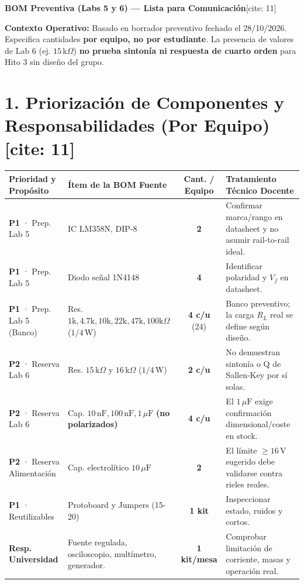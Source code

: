 \documentclass[10pt, a4paper]{article}
\begin{document}
\begin{center}
    {\Large\textbf{\textcolor{ucbblue}{BOM Preventiva (Labs 5 y 6) — Lista para Comunicación}}}[cite: 11]
\end{center}

\begin{tcolorbox}[colback=white, colframe=black, boxsep=1pt, top=2pt, bottom=2pt]
    \footnotesize\raggedright
    \textbf{Contexto Operativo:} Basado en borrador preventivo fechado el 28/10/2026. Especifica cantidades \textbf{por equipo, no por estudiante}. La presencia de valores de Lab 6 (ej. $15\,\text{k}\Omega$) \textbf{no prueba sintonía ni respuesta de cuarto orden} para Hito 3 sin diseño del grupo.
\end{tcolorbox}

\section*{1. Priorización de Componentes y Responsabilidades (Por Equipo)[cite: 11]}
\begin{table}[htbp]
    \centering
    \footnotesize
    \renewcommand{\arraystretch}{1.3}
    \begin{tabularx}{\textwidth}{|P{3.5cm}|P{3.8cm}|c|Y|}
    \hline
    \textbf{Prioridad y Propósito} & \textbf{Ítem de la BOM Fuente} & \textbf{Cant. / Equipo} & \textbf{Tratamiento Técnico Docente} \\ \hline
    \textbf{P1} · Prep. Lab 5 & IC LM358N, DIP-8 & \textbf{2} & Confirmar marca/rango en datasheet y no asumir rail-to-rail ideal.\\ \hline
    \textbf{P1} · Prep. Lab 5 & Diodo señal 1N4148 & \textbf{4} & Identificar polaridad y $V_f$ en datasheet. \\ \hline
    \textbf{P1} · Prep. Lab 5 (Banco) & Res. $1\text{k}, 4.7\text{k}, 10\text{k}, 22\text{k}, 47\text{k}, 100\text{k}\Omega$ ($1/4\,\text{W}$) & \textbf{4 c/u} (24) & Banco preventivo; la carga $R_L$ real se define según diseño. \\ \hline
    \textbf{P2} · Reserva Lab 6 & Res. $15\,\text{k}\Omega$ y $16\,\text{k}\Omega$ ($1/4\,\text{W}$) & \textbf{2 c/u} & No demuestran sintonía o Q de Sallen-Key por sí solas. \\ \hline
    \textbf{P2} · Reserva Lab 6 & Cap. $10\,\text{nF}, 100\,\text{nF}, 1\,\mu\text{F}$ \textbf{(no polarizados)} & \textbf{4 c/u} & El $1\,\mu\text{F}$ exige confirmación dimensional/coste en stock. \\ \hline
    \textbf{P2} · Reserva Alimentación & Cap. electrolítico $10\,\mu\text{F}$ & \textbf{2} & El límite $\ge 16\,\text{V}$ sugerido debe validarse contra rieles reales. \\ \hline
    \textbf{P1} · Reutilizables & Protoboard y Jumpers (15-20) & \textbf{1 kit} & Inspeccionar estado, ruidos y cortos. \\ \hline
    \textbf{Resp. Universidad} & Fuente regulada, osciloscopio, multímetro, generador. & \textbf{1 kit/mesa} & Comprobar limitación de corriente, masas y operación real. \\ \hline
    \end{tabularx}
\end{table}
\end{document}
